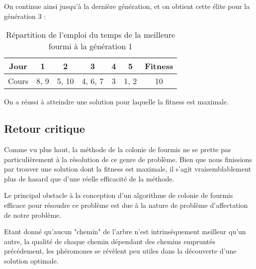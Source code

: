On continue ainsi jusqu'à la dernière génération, et on obtient cette élite pour la génération 3 : 

\begin{table}[!h]
    \centering
    \begin{tabular}{|c|c|c|c|c|c|c|}
        \hline
        Jour & 1       & 2       & 3       & 4       & 5        & Fitness       \\
        \hline
        Cours     & 8, 9 & 5, 10 & 4, 6, 7 & 3 & 1, 2 & 10\\
        \hline
    \end{tabular}
    \caption{Répartition de l'emploi du temps de la meilleure fourmi à la génération 1}\label{tab:voeux-etudiant}
\end{table}

On a réussi à atteindre une solution pour laquelle la fitness est maximale.

\subsection{Retour critique}

Comme vu plus haut, la méthode de la colonie de fourmis ne se prette pas particulièrement à la résolution de ce genre de problème. Bien que nous finissions par trouver une solution dont la fitness est maximale, il s'agit vraisemblablement plus de hasard que d'une réelle efficacité de la méthode.

Le principal obstacle à la conception d'un algorithme de colonie de fourmis efficace pour résoudre ce problème est due à la nature de problème d'affectation de notre problème.

Etant donné qu'aucun "chemin" de l'arbre n'est intrinsèquement meilleur qu'un autre, la qualité de chaque chemin dépendant des chemins empruntés précédement, les phéromones se révèlent peu utiles dans la découverte d'une solution optimale.
